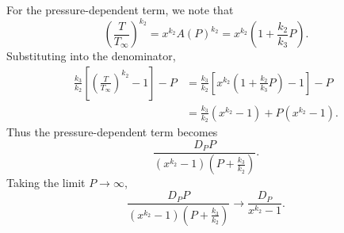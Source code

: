 \noindent For the pressure-dependent term, we note that
\begin{equation}
	\left(\frac{T}{T_{\infty}}\right)^{k_2}
	= x^{k_2} A(P)^{k_2}
	= x^{k_2}\left(1 + \frac{k_2}{k_3}P\right).
\end{equation}
Substituting into the denominator,
\begin{align}
	\frac{k_3}{k_2}\left[\left(\frac{T}{T_{\infty}}\right)^{k_2} - 1\right] - P
	&=
	\frac{k_3}{k_2}\left[x^{k_2}\left(1 + \frac{k_2}{k_3}P\right) - 1\right] - P \\
	&=
	\frac{k_3}{k_2}(x^{k_2} - 1) + P(x^{k_2} - 1).
\end{align}
Thus the pressure-dependent term becomes
\begin{equation}
	\frac{D_P P}{(x^{k_2} - 1)\left(P + \frac{k_3}{k_2}\right)}.
\end{equation}
Taking the limit $P \to \infty$,
\begin{equation}
	\frac{D_P P}{(x^{k_2} - 1)\left(P + \frac{k_3}{k_2}\right)}
	\longrightarrow
	\frac{D_P}{x^{k_2} - 1}.
\end{equation}

